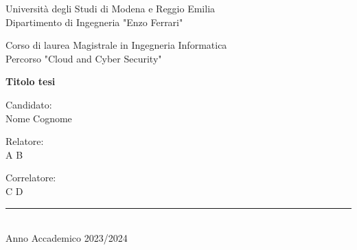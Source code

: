 \begin{titlepage}
    \begin{center}

		Università degli Studi di Modena e Reggio Emilia\\
		\large
		Dipartimento di Ingegneria "Enzo Ferrari"

        \vspace{1 cm}
        
		\Large
		Corso di laurea Magistrale in Ingegneria Informatica\\
		
		\large
		Percorso "Cloud and Cyber Security"		
		
		\vspace{2 cm}
        
        \Huge
        \textbf{Titolo tesi}

        \vspace{2 cm}

		\large
		

		\begin{flushright}
		Candidato:\\
		Nome Cognome
		\end{flushright}		        
        
        
		\Large        
        \vspace{1.5 cm}
        
        \begin{flushleft}
        Relatore:\\
        A B
        \end{flushleft}
                
        \begin{flushleft}
        Correlatore:\\
        C D
        \end{flushleft}
            
		\vfill
		
		\rule{300 pt}{0.2 pt}\\
		\small
		Anno Accademico 2023/2024
            
    \end{center}
\end{titlepage}